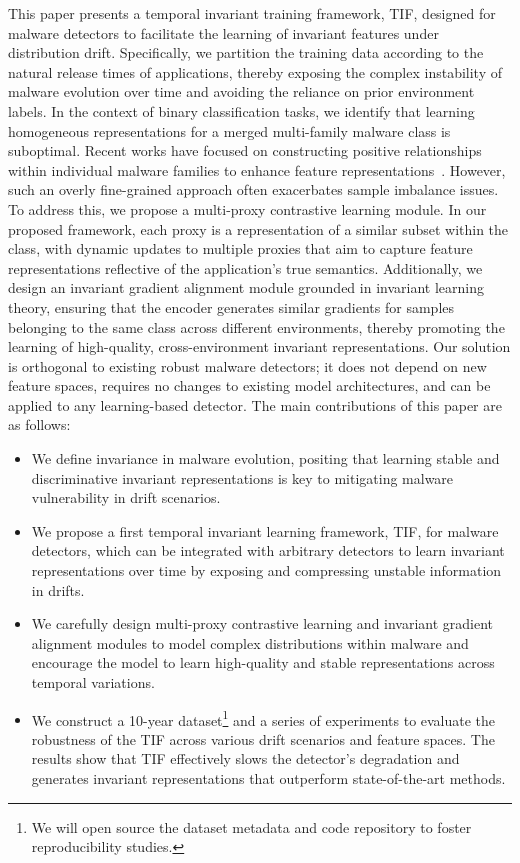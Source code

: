 This paper presents a temporal invariant training framework, TIF, designed for malware detectors to facilitate the learning of invariant features under distribution drift. Specifically, we partition the training data according to the natural release times of applications, thereby exposing the complex instability of malware evolution over time and avoiding the reliance on prior environment labels. In the context of binary classification tasks, we identify that learning homogeneous representations for a merged multi-family malware class is suboptimal. Recent works have focused on constructing positive relationships within individual malware families to enhance feature representations~\cite{continuous}. However, such an overly fine-grained approach often exacerbates sample imbalance issues. To address this, we propose a multi-proxy contrastive learning module. In our proposed framework, each proxy is a representation of a similar subset within the class, with dynamic updates to multiple proxies that aim to capture feature representations reflective of the application's true semantics. Additionally, we design an invariant gradient alignment module grounded in invariant learning theory, ensuring that the encoder generates similar gradients for samples belonging to the same class across different environments, thereby promoting the learning of high-quality, cross-environment invariant representations. Our solution is orthogonal to existing robust malware detectors; it does not depend on new feature spaces, requires no changes to existing model architectures, and can be applied to any learning-based detector. The main contributions of this paper are as follows:

\begin{itemize}
    \item We define invariance in malware evolution, positing that learning stable and discriminative invariant representations is key to mitigating malware vulnerability in drift scenarios.
    \item We propose a first temporal invariant learning framework, TIF, for malware detectors, which can be integrated with arbitrary detectors to learn invariant representations over time by exposing and compressing unstable information in drifts.
    \item We carefully design multi-proxy contrastive learning and invariant gradient alignment modules to model complex distributions within malware and encourage the model to learn high-quality and stable representations across temporal variations.
    \item We construct a 10-year dataset\footnote{We will open source the dataset metadata and code repository to foster reproducibility studies.} and a series of experiments to evaluate the robustness of the TIF across various drift scenarios and feature spaces. The results show that TIF effectively slows the detector's degradation and generates invariant representations that outperform state-of-the-art methods.
\end{itemize}